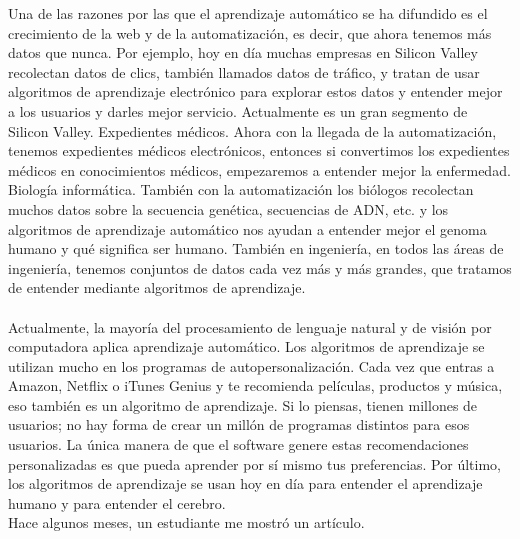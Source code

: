 \documentclass{report}
\begin{document}
Una de las razones por las que el aprendizaje automático se ha difundido es el crecimiento de la web y
de la automatización, es decir, que ahora tenemos más datos que
nunca. Por ejemplo, hoy en día muchas empresas en Silicon Valley recolectan datos de
clics, también llamados datos de tráfico, y tratan de usar algoritmos de aprendizaje
electrónico para explorar estos datos y entender mejor a los usuarios y darles
mejor servicio. Actualmente es un gran segmento de Silicon Valley. Expedientes
médicos. Ahora con la llegada de la automatización, tenemos expedientes médicos electrónicos, entonces si
convertimos los expedientes médicos en conocimientos médicos, empezaremos a entender mejor
la enfermedad. Biología informática. También con la automatización los biólogos
recolectan muchos datos sobre la secuencia genética, secuencias de ADN, etc.
y los algoritmos de aprendizaje automático nos ayudan a entender mejor el genoma
humano y qué significa ser humano. También en ingeniería, en todos las áreas de
ingeniería, tenemos conjuntos de datos cada vez más y más grandes, que
tratamos de entender mediante algoritmos de aprendizaje.\\\\ Actualmente, la mayoría del procesamiento de
lenguaje natural y de visión por computadora aplica aprendizaje automático. Los algoritmos de
aprendizaje se utilizan mucho en los programas de autopersonalización. Cada vez que entras a
Amazon, Netflix o iTunes Genius y te recomienda películas, productos y música,
eso también es un algoritmo de aprendizaje. Si lo piensas, tienen millones de usuarios;
no hay forma de crear un millón de programas distintos para esos usuarios.
La única manera de que el software genere estas recomendaciones personalizadas es
que pueda aprender por sí mismo tus preferencias. Por último, los algoritmos
de aprendizaje se usan hoy en día para entender el aprendizaje humano
y para entender el cerebro.\\ Hace algunos meses, un estudiante me mostró un artículo.
\end{document}
